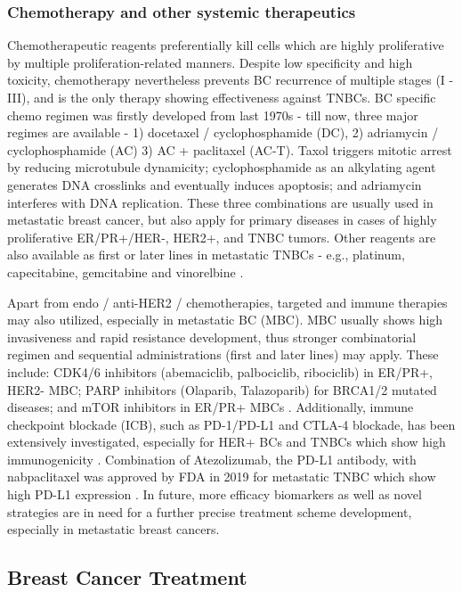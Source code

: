 \subsubsection{Chemotherapy and other systemic therapeutics}

Chemotherapeutic reagents preferentially kill cells which are highly proliferative by multiple proliferation-related manners. Despite low specificity and high toxicity, chemotherapy nevertheless prevents BC recurrence of multiple stages (I - III), and is the only therapy showing effectiveness against TNBCs. BC specific chemo regimen was firstly developed from last 1970s - till now, three major regimes are available - 1) docetaxel / cyclophosphamide (DC), 2) adriamycin / cyclophosphamide (AC) 3) AC + paclitaxel (AC-T). Taxol triggers mitotic arrest by reducing microtubule dynamicity; cyclophosphamide as an alkylating agent generates DNA crosslinks and eventually induces apoptosis; and adriamycin interferes with DNA replication. These three combinations are usually used in metastatic breast cancer, but also apply for primary diseases in cases of highly proliferative ER/PR+/HER-, HER2+, and TNBC tumors. Other reagents are also available as first or later lines in metastatic TNBCs - e.g., platinum, capecitabine, gemcitabine and vinorelbine \citep{waks2019breast}.

Apart from endo / anti-HER2 / chemotherapies, targeted and immune therapies may also utilized, especially in metastatic BC (MBC). MBC usually shows high invasiveness and rapid resistance development, thus stronger combinatorial regimen and sequential administrations (first and later lines) may apply. These include: CDK4/6 inhibitors (abemaciclib, palbociclib, ribociclib) in ER/PR+, HER2- MBC; PARP inhibitors (Olaparib, Talazoparib) for BRCA1/2 mutated diseases; and mTOR inhibitors in ER/PR+ MBCs \citep{waks2019breast}. Additionally, immune checkpoint blockade (ICB), such as PD-1/PD-L1 and CTLA-4 blockade, has been extensively investigated, especially for HER+ BCs and TNBCs which show high immunogenicity \citep{adams2019current}. Combination of Atezolizumab, the PD-L1 antibody, with nabpaclitaxel was approved by FDA in 2019 for metastatic TNBC which show high PD-L1 expression \citep{schmid2018atezolizumab}. In future, more efficacy biomarkers as well as novel strategies are in need for a further precise treatment scheme development, especially in metastatic breast cancers.

\subsection{Breast Cancer Treatment}


